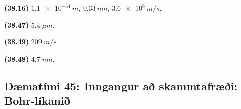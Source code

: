 \begin{enumerate}[label = \textbf{(\alph*)}]

\end{enumerate}

\begin{tcolorbox}
\begin{enumerate*}[label = ]
  \item \textbf{(38.16)} $\SI{1.1e-34}{m}$, $\SI{0.33}{nm}$, $\SI{3.6e6}{m/s}$.
  \item \textbf{(38.47)} $\SI{5.4}{\mu m}$.
  \item \textbf{(38.49)} $\SI{209}{m/s}$
  \item \textbf{(38.48)} $\SI{4.7}{nm}$.
\end{enumerate*}
\end{tcolorbox}

\newpage

\subsection*{Dæmatími 45: Inngangur að skammtafræði: Bohr-líkanið}

